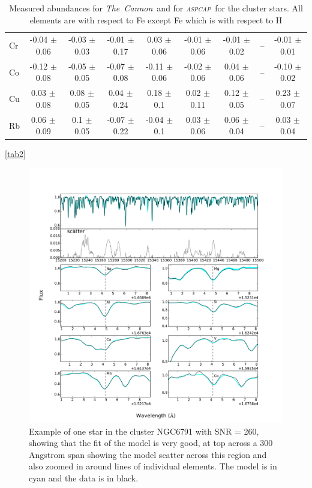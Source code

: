 \documentclass[14pt, preprint2]{aastex6}
\newcommand{\project}[1]{\textsl{#1}}
\newcommand{\tc}{\project{The~Cannon}}
\newcommand{\aspcap}{\project{\textsc{aspcap}}}
\begin{document}
\begin{table}[!h]
\begin{tabular}{ | p{} | c| c | c | c | c | c | c | c | }
Cr & -0.04 $\pm$ 0.06 &  -0.03 $\pm$ 0.03 &  -0.01 $\pm$ 0.17  & 0.03 $\pm$ 0.06 & -0.01 $\pm$ 0.06  &-0.01 $\pm$ 0.02  &  -- & -0.01 $\pm$ 0.01 \\
Co & -0.12 $\pm$ 0.08 & -0.05 $\pm$ 0.05  & -0.07 $\pm$ 0.08 & -0.11 $\pm$ 0.06 & -0.02 $\pm$ 0.06 & 0.04 $\pm$ 0.06 & --  & -0.10 $\pm$ 0.02 \\
Cu & 0.03 $\pm$ 0.08  &  0.08 $\pm$ 0.05  & 0.04 $\pm$ 0.24 & 0.18 $\pm$ 0.1  & 0.02 $\pm$ 0.11  & 0.12 $\pm$ 0.05  & --  & 0.23 $\pm$ 0.07 \\
Rb & 0.06 $\pm$ 0.09 & 0.1 $\pm$ 0.05  & -0.07 $\pm$ 0.22  & -0.04 $\pm$ 0.1 & 0.03 $\pm$ 0.06  & 0.06 $\pm$ 0.04  & --  &  0.03 $\pm$ 0.04 \\
 \hline
\end{tabular}
\caption{Measured abundances for \tc\ and for \aspcap\ for the cluster stars. All elements are with respect to Fe except Fe which is with respect to H}
\ref{tab2}
\end{table}


\begin{figure}
\centering
           \includegraphics[scale=0.5]{elementfit.pdf}
  \caption{ Example of one star in the cluster NGC6791 with SNR = 260, showing that the fit of the model is very good, at top across a 300 Angstrom span showing the model scatter across this region and also zoomed in around lines of individual elements. The model is in cyan and the data is in black. }
\label{fig:typical}
\end{figure}
\end{document}
